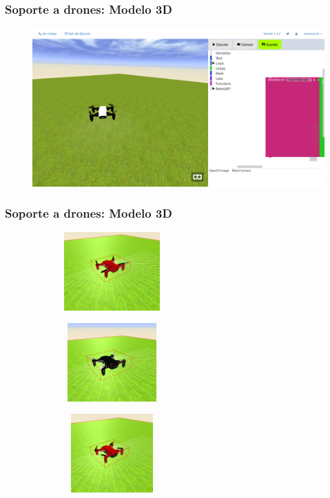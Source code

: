 \documentclass[xcolor={table}]{beamer}
\begin{document}
    	\begin{frame}
			\frametitle{Soporte a drones: Modelo 3D}
           \begin{figure}[H]
            \centering
            \includegraphics[scale=0.2]{img/WebsimDrone.png}
           \label{fig:escenarioDrone}
            \end{figure}
    	\end{frame}
    	
    	   \begin{frame}
			\frametitle{Soporte a drones: Modelo 3D}
          \begin{figure}[H]
        \centering
        \begin{subfigure}{\textwidth}
         \includegraphics[width=4cm, height=3cm]{img/red_drone.png}
 \label{fig:drone_rojo}
        \end{subfigure}
        \begin{subfigure}{\textwidth}
         \includegraphics[width=4cm, height=3cm]{img/black_drone.png}
   \label{fig:drone_negro}
        \end{subfigure}
        \begin{subfigure}{\textwidth}
         \includegraphics[width=4cm, height=3cm]{img/red_blackdrone.png}
   \label{fig:drone_negrorojo}
        \end{subfigure}
    \end{figure}
    	\end{frame}
		   
\end{document}
